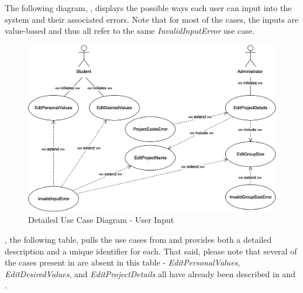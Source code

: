 \documentclass[12pt,letterpaper]{article}
\begin{document}
The following diagram, , displays the possible ways each user can input into the system and their associated errors. Note that for most of the cases, the inputs are value-based and thus
all refer to the same {\it InvalidInputError} use case.

\begin{figure}[H]
	\centering{}
	\includegraphics[scale=0.3]{imgs/detailed-user-input-use-case-diagram.png}
	\caption{Detailed Use Case Diagram - User Input}
\end{figure}

, the following table, pulls the use cases from  and provides both a detailed description and a unique identifier for each. That said, please note that several of the cases present in  are absent in this table - {\it EditPersonalValues}, {\it EditDesiredValues}, and {\it EditProjectDetails} all have already been described in  and .
\end{document}
